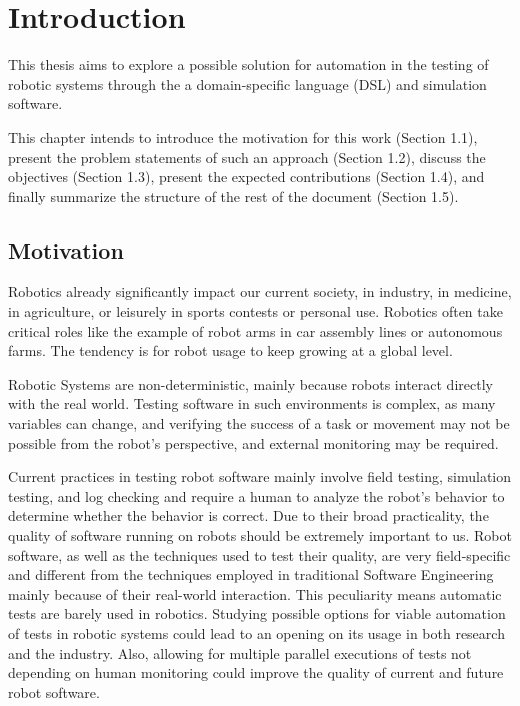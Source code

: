 \chapter{Introduction}
\label{chap:introduction}

This thesis aims to explore a possible solution for automation in the testing of robotic systems through the a domain-specific language (DSL) and simulation software.

This chapter intends to introduce the motivation for this work (Section 1.1), present the problem statements of such an approach (Section 1.2), discuss the objectives (Section 1.3), present the expected contributions (Section 1.4), and finally summarize the structure of the rest of the document (Section 1.5).


\section{Motivation}
\label{sec:motivation}

Robotics already significantly impact our current society, in industry, in medicine, in agriculture, or leisurely in sports contests or personal use. Robotics often take critical roles like the example of robot arms in car assembly lines or autonomous farms. The tendency is for robot usage to keep growing at a global level. 

Robotic Systems are non-deterministic, mainly because robots interact directly with the real world. Testing software in such environments is complex, as many variables can change, and verifying the success of a task or movement may not be possible from the robot's perspective, and external monitoring may be required.

Current practices in testing robot software mainly involve field testing, simulation testing, and log checking and require a human to analyze the robot's behavior to determine whether the behavior is correct. Due to their broad practicality, the quality of software running on robots should be extremely important to us. Robot software, as well as the techniques used to test their quality, are very field-specific and different from the techniques employed in traditional Software Engineering mainly because of their real-world interaction. This peculiarity means automatic tests are barely used in robotics. Studying possible options for viable automation of tests in robotic systems could lead to an opening on its usage in both research and the industry. Also, allowing for multiple parallel executions of tests not depending on human monitoring could improve the quality of current and future robot software.


